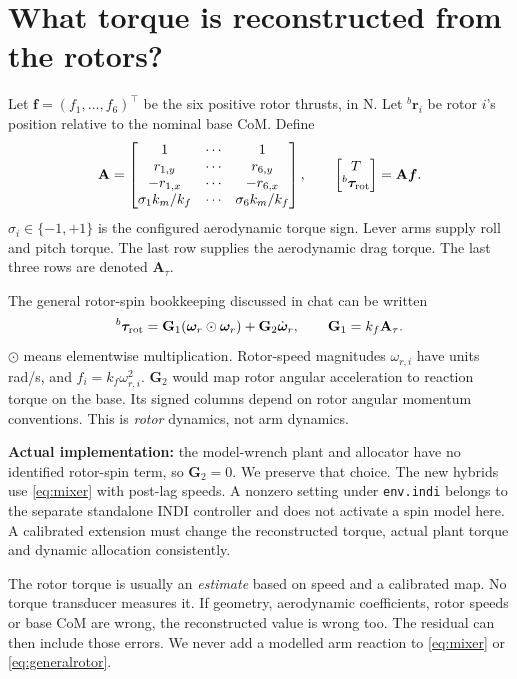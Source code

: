 \documentclass[11pt,a4paper]{article}
\newcommand{\vct}[1]{\boldsymbol{#1}}
\newcommand{\mat}[1]{\mathbf{#1}}
\newcommand{\bv}[1]{{}^{b}\vct{#1}}
\begin{document}
\section{What torque is reconstructed from the rotors?}\label{sec:rotors}

Let $\vct f=(f_1,\ldots,f_6)^\top$ be the six positive rotor thrusts, in N.
Let $\bv r_i$ be rotor $i$'s position relative to the nominal base CoM. Define
\begin{equation}
\mat A=\begin{bmatrix}
1&\cdots&1\\
r_{1,y}&\cdots&r_{6,y}\\
-r_{1,x}&\cdots&-r_{6,x}\\
\sigma_1 k_m/k_f&\cdots&\sigma_6 k_m/k_f
\end{bmatrix},\qquad
\begin{bmatrix}T\\\bv\tau_{\rm rot}\end{bmatrix}=\mat A\vct f.
\label{eq:mixer}
\end{equation}
$\sigma_i\in\{-1,+1\}$ is the configured aerodynamic torque sign. Lever arms
supply roll and pitch torque. The last row supplies the aerodynamic drag torque.
The last three rows are denoted $\mat A_\tau$.

The general rotor-spin bookkeeping discussed in chat can be written
\begin{equation}
\bv\tau_{\rm rot}=\mat G_1(\vct\omega_r\odot\vct\omega_r)
+\mat G_2\dot{\vct\omega}_r,\qquad
\mat G_1=k_f\mat A_\tau.
\label{eq:generalrotor}
\end{equation}
$\odot$ means elementwise multiplication. Rotor-speed magnitudes
$\omega_{r,i}$ have units rad/s, and $f_i=k_f\omega_{r,i}^2$.
$\mat G_2$ would map rotor angular acceleration to reaction torque on the base.
Its signed columns depend on rotor angular momentum conventions. This is
\emph{rotor} dynamics, not arm dynamics.

\textbf{Actual implementation:} the model-wrench plant and allocator have no
identified rotor-spin term, so $\mat G_2=0$. We preserve that choice. The new
hybrids use \eqref{eq:mixer} with post-lag speeds. A nonzero setting under
\texttt{env.indi} belongs to the separate standalone INDI controller and does not
activate a spin model here. A calibrated extension must change the reconstructed
torque, actual plant torque and dynamic allocation consistently.

The rotor torque is usually an \emph{estimate} based on speed and a calibrated
map. No torque transducer measures it. If geometry, aerodynamic coefficients,
rotor speeds or base CoM are wrong, the reconstructed value is wrong too.
The residual can then include those errors. We never add a modelled arm reaction
to \eqref{eq:mixer} or \eqref{eq:generalrotor}.
\end{document}
